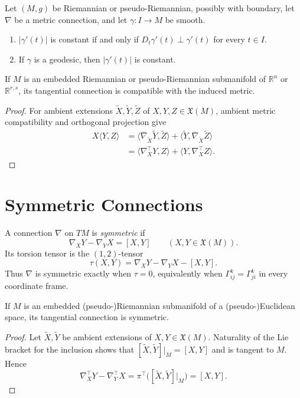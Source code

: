\begin{corollary}
\label{cor:metric-connection-norm-geodesic}

Let $(M,g)$ be Riemannian or pseudo-Riemannian, possibly with boundary, let
$\nabla$ be a metric connection, and let $\gamma:I\to M$ be smooth.
\begin{enumerate}
\item[(a)] $|\gamma'(t)|$ is constant if and only if
$D_t\gamma'(t)\perp\gamma'(t)$ for every $t\in I$.
\item[(b)] If $\gamma$ is a geodesic, then $|\gamma'(t)|$ is constant.
\end{enumerate}
\end{corollary}

\begin{proposition}
\label{prop:tangential-connection-compatible-metric}

If $M$ is an embedded Riemannian or pseudo-Riemannian submanifold of
$\mathbb R^n$ or $\mathbb R^{r,s}$, its tangential connection is compatible
with the induced metric.

\begin{proof}
\sketch For ambient extensions $\widetilde X,\widetilde Y,\widetilde Z$ of
$X,Y,Z\in\mathfrak X(M)$, ambient metric compatibility and orthogonal
projection give
\begin{align*}
X\langle Y,Z\rangle
&=\langle\overline\nabla_{\widetilde X}\widetilde Y,\widetilde Z\rangle
 +\langle\widetilde Y,\overline\nabla_{\widetilde X}\widetilde Z\rangle\\
&=\langle\nabla_X^\top Y,Z\rangle+\langle Y,\nabla_X^\top Z\rangle.
\end{align*}
\end{proof}
\end{proposition}

\section{Symmetric Connections}

A connection $\nabla$ on $TM$ is \emph{symmetric} if
\[
\nabla_XY-\nabla_YX=[X,Y]
\qquad(X,Y\in\mathfrak X(M)).
\]
Its torsion tensor is the $(1,2)$-tensor
\[
\tau(X,Y)=\nabla_XY-\nabla_YX-[X,Y].
\]
Thus $\nabla$ is symmetric exactly when $\tau=0$, equivalently when
$\Gamma^k_{ij}=\Gamma^k_{ji}$ in every coordinate frame.

\begin{proposition}
\label{prop:tangential-connection-symmetric}


If $M$ is an embedded (pseudo-)Riemannian submanifold of a
(pseudo-)Euclidean space, its tangential connection is symmetric.

\begin{proof}
\sketch Let $\widetilde X,\widetilde Y$ be ambient extensions of
$X,Y\in\mathfrak X(M)$. Naturality of the Lie bracket for the inclusion shows
that $[\widetilde X,\widetilde Y]|_M=[X,Y]$ and is tangent to $M$. Hence
\[
\nabla_X^\top Y-\nabla_Y^\top X
=\pi^\top\bigl([\widetilde X,\widetilde Y]|_M\bigr)=[X,Y].
\]
\end{proof}
\end{proposition}

